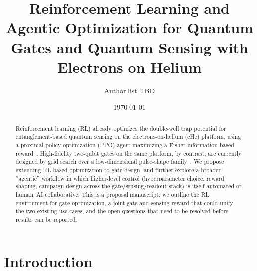 \documentclass[aps,prapplied,reprint,superscriptaddress,longbibliography]{revtex4-2}
\begin{document}
\title{Reinforcement Learning and Agentic Optimization for Quantum Gates and Quantum Sensing with
Electrons on Helium}

\author{Author list TBD}

\date{\today}

\begin{abstract}
Reinforcement learning (RL) already optimizes the double-well trap potential for entanglement-based
quantum sensing on the electrons-on-helium (eHe) platform, using a proximal-policy-optimization
(PPO) agent maximizing a Fisher-information-based reward~\cite{perruzza2026}. High-fidelity
two-qubit gates on the same platform, by contrast, are currently designed by grid search over a
low-dimensional pulse-shape family~\cite{leinonen2025}. We propose extending RL-based optimization
to gate design, and further explore a broader ``agentic'' workflow in which higher-level control
(hyperparameter choice, reward shaping, campaign design across the gate/sensing/readout stack) is
itself automated or human--AI collaborative. This is a proposal manuscript: we outline the RL
environment for gate optimization, a joint gate-and-sensing reward that could unify the two existing
use cases, and the open questions that need to be resolved before results can be reported.
\end{abstract}

\maketitle

\section{Introduction}
\end{document}
